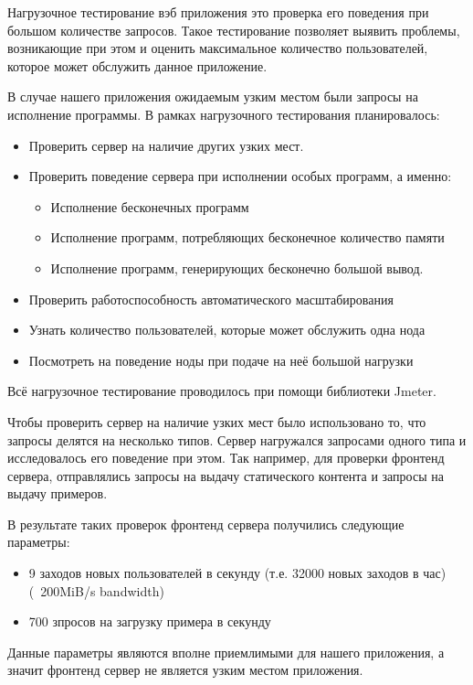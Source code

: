 	Нагрузочное тестирование вэб приложения это проверка его поведения при большом количестве запросов. Такое тестирование позволяет выявить проблемы, возникающие при этом и оценить максимальное количество пользователей, которое может обслужить данное приложение.
	
	В случае нашего приложения ожидаемым узким местом были запросы на исполнение программы. В рамках нагрузочного тестирования планировалось: 
\begin{itemize}
\item Проверить сервер на наличие других узких мест.
\item Проверить поведение сервера при исполнении особых программ, а именно:
	\begin{itemize}
		\item Исполнение бесконечных программ
		\item Исполнение программ, потребляющих бесконечное количество памяти
		\item Исполнение программ, генерирующих бесконечно большой вывод.
	\end{itemize}
\item Проверить работоспособность автоматического масштабирования
\item Узнать количество пользователей, которые может обслужить одна нода
\item Посмотреть на поведение ноды при подаче на неё большой нагрузки
\end{itemize}

	Всё нагрузочное тестирование проводилось при помощи библиотеки Jmeter.

	Чтобы проверить сервер на наличие узких мест было использовано то, что запросы делятся на несколько типов. Сервер нагружался запросами одного типа и исследовалось его поведение при этом. Так например, для проверки фронтенд сервера, отправлялись запросы на выдачу статического контента и запросы на выдачу примеров.
	
	В результате таких проверок фронтенд сервера получились следующие параметры:
\begin{itemize}
	\item 9 заходов новых пользователей в секунду (т.е. 32000 новых заходов в час) (~200MiB/s bandwidth)
	\item 700 зпросов на загрузку примера в секунду
\end{itemize}
	Данные параметры являются вполне приемлимыми для нашего приложения, а значит фронтенд сервер не является узким местом приложения. 
	
